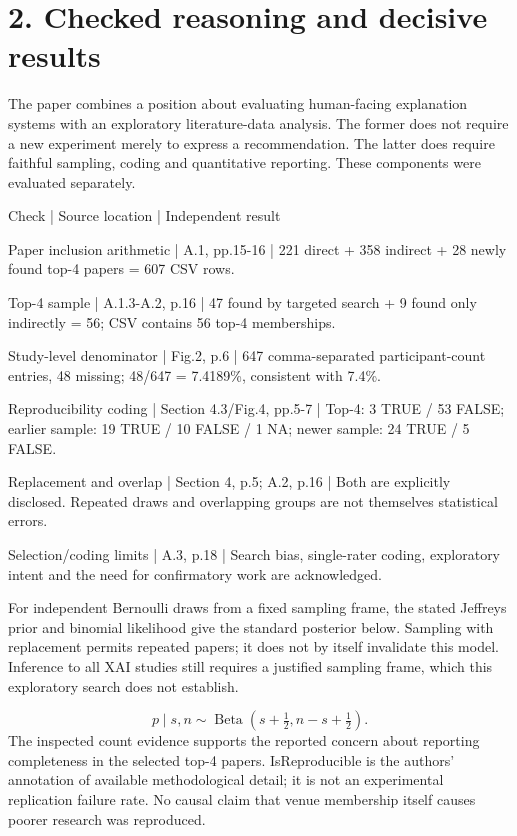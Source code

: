 \documentclass[10pt]{article}
\begin{document}
\section*{2. Checked reasoning and decisive results}
The paper combines a position about evaluating human-facing explanation systems with an exploratory literature-data analysis. The former does not require a new experiment merely to express a recommendation. The latter does require faithful sampling, coding and quantitative reporting. These components were evaluated separately.\par
Check | Source location | Independent result\par
Paper inclusion arithmetic | A.1, pp.15-16 | 221 direct + 358 indirect + 28 newly found top-4 papers = 607 CSV rows.\par
Top-4 sample | A.1.3-A.2, p.16 | 47 found by targeted search + 9 found only indirectly = 56; CSV contains 56 top-4 memberships.\par
Study-level denominator | Fig.2, p.6 | 647 comma-separated participant-count entries, 48 missing; 48/647 = 7.4189\%, consistent with 7.4\%.\par
Reproducibility coding | Section 4.3/Fig.4, pp.5-7 | Top-4: 3 TRUE / 53 FALSE; earlier sample: 19 TRUE / 10 FALSE / 1 NA; newer sample: 24 TRUE / 5 FALSE.\par
Replacement and overlap | Section 4, p.5; A.2, p.16 | Both are explicitly disclosed. Repeated draws and overlapping groups are not themselves statistical errors.\par
Selection/coding limits | A.3, p.18 | Search bias, single-rater coding, exploratory intent and the need for confirmatory work are acknowledged.\par
For independent Bernoulli draws from a fixed sampling frame, the stated Jeffreys prior and binomial likelihood give the standard posterior below. Sampling with replacement permits repeated papers; it does not by itself invalidate this model. Inference to all XAI studies still requires a justified sampling frame, which this exploratory search does not establish.\par
\[p\mid s,n\sim\operatorname{Beta}\!\left(s+\tfrac12,n-s+\tfrac12\right).\] The inspected count evidence supports the reported concern about reporting completeness in the selected top-4 papers. IsReproducible is the authors’ annotation of available methodological detail; it is not an experimental replication failure rate. No causal claim that venue membership itself causes poorer research was reproduced.\par
\end{document}
